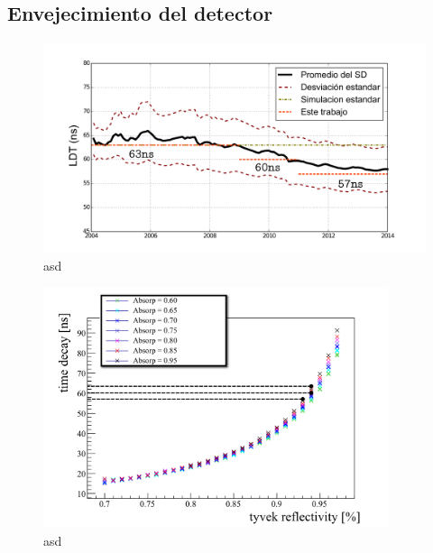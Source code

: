 	
	\subsection{Envejecimiento del detector}
	
	\begin{figure}[h!]
		\begin{center}
			\includegraphics[width=\textwidth]{fig/resultadosAuger/timeEvolution}
			\caption{asd}
			\label{fig:}
		\end{center}
	\end{figure}
	
	\begin{figure}[h!]
		\begin{center}
			\includegraphics[width=0.9\textwidth]{fig/resultadosAuger/timedecay_vs_reflect_absorp}
			\caption{asd}
			\label{fig:}
		\end{center}
	\end{figure}
	

